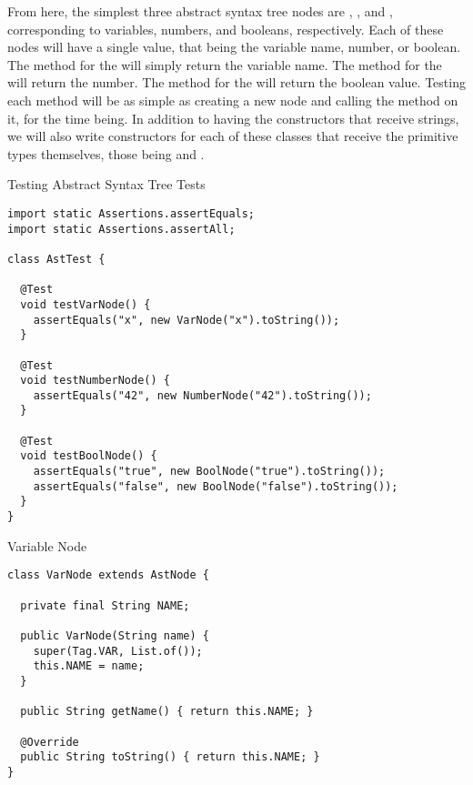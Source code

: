 From here, the simplest three abstract syntax tree nodes are , , and , corresponding to variables, numbers, and booleans, respectively. Each of these nodes will have a single value, that being the variable name, number, or boolean. The  method for the  will simply return the variable name. The  method for the  will return the number. The  method for the  will return the boolean value. Testing each method will be as simple as creating a new node and calling the  method on it, for the time being. In addition to having the constructors that receive strings, we will also write constructors for each of these classes that receive the primitive types themselves, those being  and .

\begin{cl}{Testing Abstract Syntax Tree Tests}
\begin{lstlisting}[language=MyJava]
import static Assertions.assertEquals;
import static Assertions.assertAll;

class AstTest {

  @Test
  void testVarNode() {
    assertEquals("x", new VarNode("x").toString());
  }

  @Test
  void testNumberNode() {
    assertEquals("42", new NumberNode("42").toString());
  }

  @Test
  void testBoolNode() {
    assertEquals("true", new BoolNode("true").toString());
    assertEquals("false", new BoolNode("false").toString());
  }  
}
\end{lstlisting}
\end{cl}

\begin{cl}{Variable Node}
\begin{lstlisting}[language=MyJava]
class VarNode extends AstNode {

  private final String NAME;

  public VarNode(String name) {
    super(Tag.VAR, List.of());
    this.NAME = name;
  }

  public String getName() { return this.NAME; }

  @Override
  public String toString() { return this.NAME; }
}
\end{lstlisting}
\end{cl}

